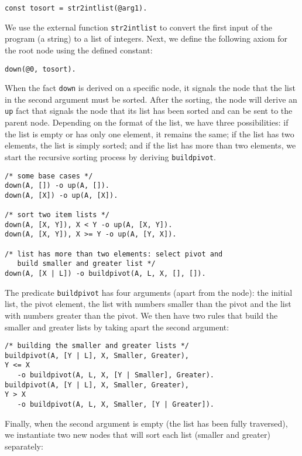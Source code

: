 \documentclass[11pt]{article}
\begin{document}
\begin{verbatim}
const tosort = str2intlist(@arg1).
\end{verbatim}

We use the external function \texttt{str2intlist} to convert the first input of the program (a string) to a list of integers. Next, we define the following axiom for the root node using the defined constant:

\begin{verbatim}
down(@0, tosort).
\end{verbatim}

When the fact \texttt{down} is derived on a specific node, it signals the node that the list in the second argument must be sorted. After the sorting, the node will derive an \texttt{up} fact that signals the node that its list has been sorted and can be sent to the parent node. Depending on the format of the list, we have three possibilities: if the list is empty or has only one element, it remains the same; if the list has two elements, the list is simply sorted; and if the list has more than two elements, we start the recursive sorting process by deriving \texttt{buildpivot}.

\begin{verbatim}
/* some base cases */
down(A, []) -o up(A, []).
down(A, [X]) -o up(A, [X]).

/* sort two item lists */
down(A, [X, Y]), X < Y -o up(A, [X, Y]).
down(A, [X, Y]), X >= Y -o up(A, [Y, X]).

/* list has more than two elements: select pivot and
   build smaller and greater list */
down(A, [X | L]) -o buildpivot(A, L, X, [], []).
\end{verbatim}

The predicate \texttt{buildpivot} has four arguments (apart from the node): the initial list, the pivot element, the list with numbers smaller than the pivot and the list with numbers greater than the pivot. We then have two rules that build the smaller and greater lists by taking apart the second argument:

\begin{verbatim}
/* building the smaller and greater lists */
buildpivot(A, [Y | L], X, Smaller, Greater),
Y <= X
   -o buildpivot(A, L, X, [Y | Smaller], Greater).
buildpivot(A, [Y | L], X, Smaller, Greater),
Y > X
   -o buildpivot(A, L, X, Smaller, [Y | Greater]).
\end{verbatim}

Finally, when the second argument is empty (the list has been fully traversed), we instantiate two new nodes that will sort each list (smaller and greater) separately:
\end{document}

